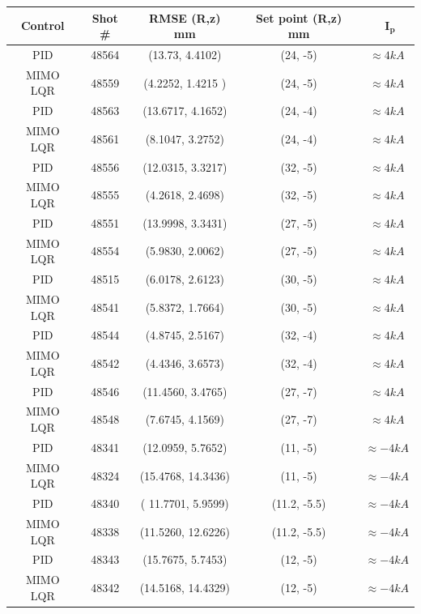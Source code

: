 \begin{center}
	\begin{longtable}{||c| c| c| c|c||} 
		\hline
		\textbf{Control} &  \textbf{Shot \#} &\textbf{RMSE (R,z) mm} & \textbf{ Set point (R,z) mm} &\ $\mathbf{I_p}$ \\ [0.5ex] 
		\hline\hline
		PID & 48564 &  (13.73, 4.4102) & (24, -5)&  $\approx 4 kA$ \\ 
		\hline
		MIMO LQR & 48559 & (4.2252, 1.4215 ) & (24, -5)&  $\approx 4 kA$	\\
		\hline
		PID & 48563 & (13.6717,	4.1652)  & (24, -4)& $\approx 4 kA$ \\ 
		\hline
		MIMO LQR & 48561 & (8.1047,	3.2752) & (24, -4)& $\approx 4 kA$ \\
		\hline
		PID & 48556 & (12.0315,	3.3217)  & (32, -5)& $\approx 4 kA$  \\ 
		\hline
		MIMO LQR & 48555 & (4.2618, 2.4698) & (32, -5) &  $\approx 4 kA$ \\
		\hline
		PID & 48551 & (13.9998,	3.3431)  & (27, -5) &  $\approx 4 kA$ \\ 
		\hline
		MIMO LQR & 48554 & (5.9830, 2.0062)  & (27, -5) &  $\approx 4 kA$ \\
		\hline
		PID & 48515 & (6.0178,	2.6123)  & (30, -5) & $\approx 4 kA$ \\ 
		\hline
		MIMO LQR & 48541 & (5.8372,	1.7664) & (30, -5) &  $\approx 4 kA$\\
		\hline
		PID & 48544 & (4.8745,	2.5167)  & (32, -4)& $\approx 4 kA$ \\ 
		\hline
		MIMO LQR & 48542 & (4.4346,	3.6573) & (32, -4)&  $\approx 4 kA$ \\
		\hline
		PID & 48546 & (11.4560, 3.4765)  & (27, -7)&   $\approx 4 kA$\\ 
		\hline
		MIMO LQR & 48548 & (7.6745, 4.1569) & (27, -7)&  $\approx 4 kA$ \\
		\hline
		PID & 48341 & (12.0959,	5.7652)  & (11, -5)& $\approx -4 kA$\\ 
		\hline
		MIMO LQR & 48324 &  (15.4768,	14.3436)& (11, -5)& $\approx -4 kA$ \\
		\hline
		PID & 48340 & ( 11.7701, 5.9599) & (11.2, -5.5)&  $\approx -4 kA$\\ 
		\hline
		MIMO LQR & 48338 & (11.5260,	12.6226) & (11.2, -5.5) &  $\approx -4 kA$\\
		\hline
		PID & 48343 &(15.7675,	5.7453)   & (12, -5)&  $\approx -4 kA$  \\ 
		\hline
		MIMO LQR & 48342 & (14.5168,	14.4329) & (12, -5)&  $\approx -4 kA$  \\

\end{longtable}
\end{center}
